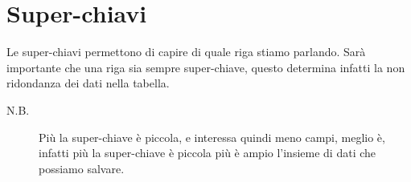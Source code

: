 \section{Super-chiavi}

Le super-chiavi permettono di capire di quale riga stiamo parlando. Sarà importante che una riga sia sempre super-chiave, questo determina infatti la non ridondanza dei dati nella tabella.

\begin{description}
	\item[N.B.] Più la super-chiave è piccola, e interessa quindi meno campi, meglio è, infatti più la super-chiave è piccola più è ampio l'insieme di dati che possiamo salvare.
\end{description}